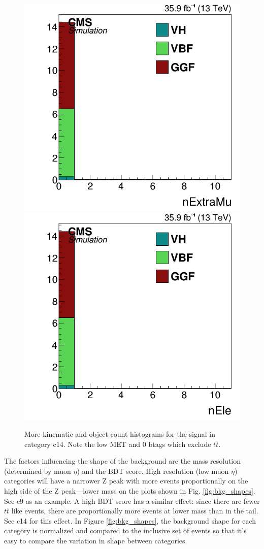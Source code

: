 \begin{figure}[h!]
  \includegraphics[width=0.32\linewidth]{images/bdt_cats/sig_kinematics_nExtraMu_c14.png}
  \includegraphics[width=0.32\linewidth]{images/bdt_cats/sig_kinematics_nEle_c14.png}
  \caption[Even more kinematic and object count distributions for the signal MC in the most sensitive category.]
   {More kinematic and object count histograms for the signal in category c14. Note the low MET and 0 btags which exclude $t\bar{t}$.}
  \label{fig:sig_kinematics_c14-3}
\end{figure}

The factors influencing the shape of the background are the mass resolution (determined by muon $\eta$) and the BDT score. High resolution (low muon $\eta$)
categories will have a narrower Z peak with more events proportionally
on the high side of the Z peak---lower mass on the plots shown in Fig. \ref{fig:bkg_shapes}.
See c9 as an example. A high BDT score has a similar effect: since there are fewer $t\bar{t}$ like events, there are proportionally
more events at lower mass than in the tail. See c14 for this effect. In Figure \ref{fig:bkg_shapes}, the background shape for each category
is normalized and compared to the inclusive set of events so that it's easy to compare the variation in shape between categories.

